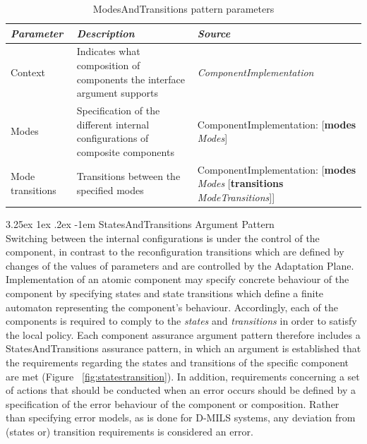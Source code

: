 \documentclass[12pt,twoside,a4paper]{article}
\makeatletter
\renewcommand\paragraph{\@startsection{paragraph}{5}{\z@}%
  {3.25ex \@plus1ex \@minus.2ex}%
  {-1em}%
  {\normalfont\normalsize\bfseries}}
\makeatother
\begin{document}
\begin{table}[htbp]
    \centering
    \caption{ModesAndTransitions pattern parameters}
    \begin{tabularx}{\textwidth}{| X | X | X |}
        \hline
        \textit{\textbf{Parameter}}     & \textit{\textbf{Description}}    & \textit{\textbf{Source}}     \\ \hline
       Context        & Indicates what composition of components the interface argument supports & \textit{ComponentImplementation}      \\ \hline
       Modes        & Specification of the different internal configurations of composite components & ComponentImplementation: [\textbf{modes} \textit{Modes}] \\ \hline
       Mode transitions & Transitions between the specified modes & ComponentImplementation: [\textbf{modes} \textit{Modes} [\textbf{transitions} \textit{ModeTransitions}]]  \\ \hline        
    \end{tabularx}
    \label{tab:modestransition_params}
\end{table}

\clearpage
\paragraph{StatesAndTransitions Argument Pattern}\label{sec:states-transition-ap}
~\\
Switching between the internal configurations is under the control of the component, in contrast to the reconfiguration transitions which are defined by changes of the values of parameters and are controlled by the Adaptation Plane. Implementation of an atomic component may specify concrete behaviour of the component by specifying states and state transitions which define a finite automaton representing the component's behaviour. Accordingly, each of the components is required to comply to the \textit{states} and \textit{transitions} in order to satisfy the local policy. Each component assurance argument pattern therefore includes a StatesAndTransitions assurance pattern, in which an argument is established that the requirements regarding the states and transitions of the specific component are met (Figure ~\ref{fig:statestransition}). In addition, requirements concerning a set of actions that should be conducted when an error occurs should be defined by a specification of the error behaviour of the component or composition. Rather than specifying error models, as is done for D-MILS systems, any deviation from (states or) transition requirements is considered an error. 
\end{document}
